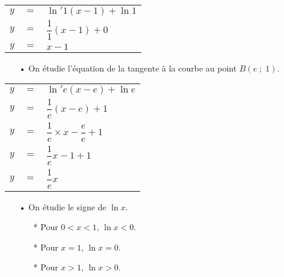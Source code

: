 \vspace*{.3cm}

\begin{tabular}{lll}
$y$ & $=$ & $\ln'1\left(x-1\right)+\ln 1$ \vspace*{.2cm} \\
$y$ & $=$ & $\dfrac{1}{1}\left(x-1\right)+0$ \vspace*{.2cm} \\
$y$ & $=$ & $x-1$
\end{tabular}

\vspace*{.3cm}

\begin{itemize}
\item[•] On étudie l'équation de la tangente à la courbe au point $B\left(e\; ; \; 1\right)$.
\end{itemize}

\vspace*{.3cm}

\begin{tabular}{lll}
$y$ & $=$ & $\ln'e\left(x-e\right)+\ln e$ \vspace*{.2cm} \\
$y$ & $=$ & $\dfrac{1}{e}\left(x-e\right)+1$ \vspace*{.2cm} \\
$y$ & $=$ & $\dfrac{1}{e} \times x - \dfrac{e}{e} + 1$ \vspace*{.2cm} \\
$y$ & $=$ & $\dfrac{1}{e}x - 1 + 1$ \vspace*{.2cm} \\
$y$ & $=$ & $\dfrac{1}{e}x$ \vspace*{.2cm} \\
\end{tabular}

\vspace*{.3cm}

\begin{itemize}
\item[•] On étudie le signe de $\ln x$. \\

\begin{itemize}
\item[*] Pour $0 < x < 1$, $\ln x < 0$.
\item[*] Pour $x = 1$, $\ln x = 0$.
\item[*] Pour $x > 1$, $\ln x > 0$.
\end{itemize}
\end{itemize}

